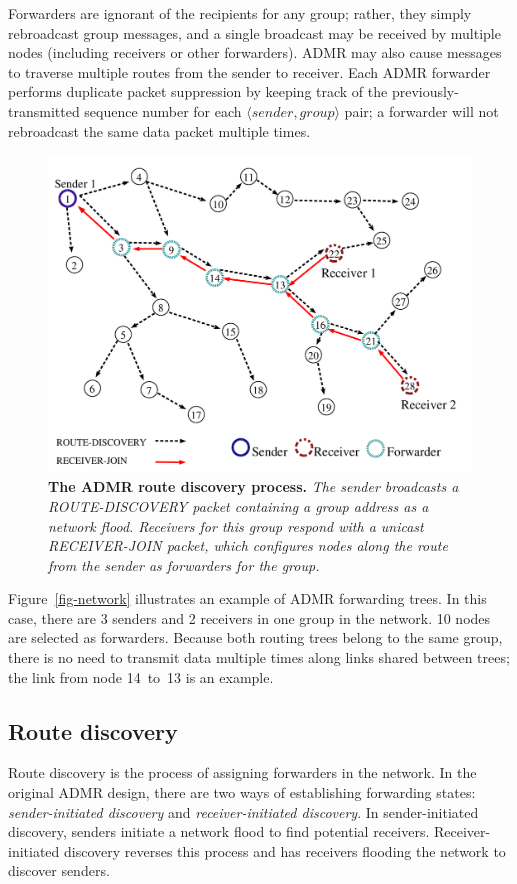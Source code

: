 Forwarders are ignorant of the recipients for
any group; rather, they simply rebroadcast group messages, and
a single broadcast may be received by multiple
nodes (including receivers or other forwarders). 
ADMR may also cause messages to traverse multiple routes from
the sender to receiver.
Each ADMR forwarder performs duplicate packet suppression by keeping 
track of the previously-transmitted sequence number for each
$\langle \mathit{sender},\mathit{group} \rangle$ pair; a forwarder
will not rebroadcast the same data packet multiple times.

\begin{figure}
\begin{center}
\includegraphics[width=0.6\hsize]{./resources/tinyadmr-techrept05/figures/background/admr_discovery.pdf}
\end{center}
\caption{{\small {\bf The ADMR route discovery process.}
{\em The sender broadcasts a ROUTE-DISCOVERY packet containing a 
group address as a network flood. Receivers for this group
respond with a unicast RECEIVER-JOIN packet, which configures
nodes along the route from the sender as forwarders for the group.}}}
\label{fig-discovery}
\end{figure}

Figure~\ref{fig-network} illustrates an example of ADMR forwarding trees.
In this case, there are 3 senders and 2 receivers in
one group in the network. 10 nodes are selected as forwarders. 
Because both routing trees belong to the same group, there is no
need to transmit data multiple times along links shared between trees; 
the link from node 14~to~13 is an example.

\subsection{Route discovery}
\label{sec-tinyadmr-discovery}

Route discovery is the process of assigning forwarders in the network. 
In the original ADMR design,
there are two ways of establishing forwarding states: 
{\em sender-initiated discovery} and 
{\em receiver-initiated discovery}. In sender-initiated discovery,
senders initiate a network flood to find potential receivers.
Receiver-initiated discovery reverses this process and 
has receivers flooding the network to discover senders.

